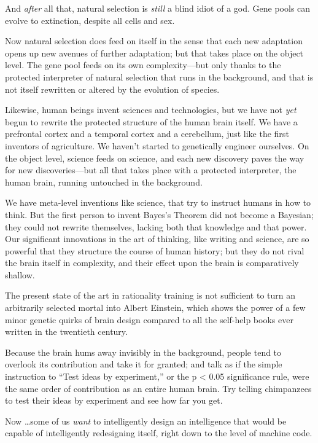 {
 And \textit{after} all that, natural selection is \textit{still} a
blind idiot of a god. Gene pools can evolve to extinction, despite all
cells and sex.}

{
 Now natural selection does feed on itself in the sense that each
new adaptation opens up new avenues of further adaptation; but that
takes place on the object level. The gene pool feeds on its own
complexity---but only thanks to the protected interpreter of natural
selection that runs in the background, and that is not itself rewritten
or altered by the evolution of species.}

{
 Likewise, human beings invent sciences and technologies, but we
have not \textit{yet} begun to rewrite the protected structure of the
human brain itself. We have a prefrontal cortex and a temporal cortex
and a cerebellum, just like the first inventors of agriculture. We
haven't started to genetically engineer ourselves. On
the object level, science feeds on science, and each new discovery
paves the way for new discoveries---but all that takes place with a
protected interpreter, the human brain, running untouched in the
background.}

{
 We have meta-level inventions like science, that try to instruct
humans in how to think. But the first person to invent
Bayes's Theorem did not become a Bayesian; they could
not rewrite themselves, lacking both that knowledge and that power. Our
significant innovations in the art of thinking, like writing and
science, are so powerful that they structure the course of human
history; but they do not rival the brain itself in complexity, and
their effect upon the brain is comparatively shallow.}

{
 The present state of the art in rationality training is not
sufficient to turn an arbitrarily selected mortal into Albert Einstein,
which shows the power of a few minor genetic quirks of brain design
compared to all the self-help books ever written in the twentieth
century.}

{
 Because the brain hums away invisibly in the background, people
tend to overlook its contribution and take it for granted; and talk as
if the simple instruction to ``Test ideas by
experiment,'' or the p {\textless} 0.05 significance
rule, were the same order of contribution as an entire human brain. Try
telling chimpanzees to test their ideas by experiment and see how far
you get.}

{
 Now \ldots some of us \textit{want} to intelligently design an
intelligence that would be capable of intelligently redesigning itself,
right down to the level of machine code.}

